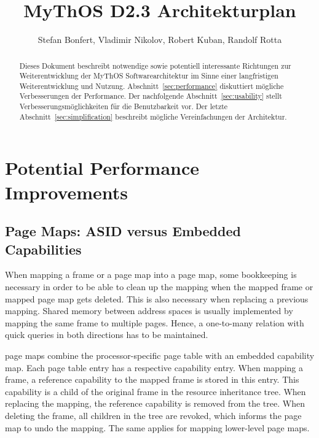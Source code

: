 

\title{MyThOS D2.3 Architekturplan}
\author{Stefan Bonfert, Vladimir Nikolov, Robert Kuban, Randolf Rotta}



\maketitle

\begin{abstract}
  Dieses Dokument beschreibt notwendige sowie potentiell interessante
  Richtungen zur Weiterentwicklung der MyThOS Softwarearchitektur im
  Sinne einer langfristigen Weiterentwicklung und
  Nutzung. Abschnitt~\ref{sec:performance} diskuttiert mögliche
  Verbesserungen der Performance. Der nachfolgende
  Abschnitt~\ref{sec:usability} stellt Verbesserungsmöglichkeiten für
  die Benutzbarkeit vor. Der letzte Abschnitt~\ref{sec:simplification}
  beschreibt mögliche Vereinfachungen der Architektur.
\end{abstract}

\newpage
\tableofcontents

\section{Potential Performance Improvements}
\label{sec:performance}

\subsection{Page Maps: ASID versus Embedded Capabilities}
When mapping a frame or a page map into a page map, some bookkeeping is necessary in order to be able to clean up the mapping when the mapped frame or mapped page map gets deleted. This is also necessary when replacing a previous mapping. Shared memory between address spaces is usually implemented by mapping the same frame to multiple pages. Hence, a one-to-many relation with quick queries in both directions has to be maintained.

\mythos page maps combine the processor-specific page table with an embedded capability map. Each page table entry has a respective capability entry. When mapping a frame, a reference capability to the mapped frame is stored in this entry. This capability is a child of the original frame in the resource inheritance tree. When replacing the mapping, the reference capability is removed from the tree. When deleting the frame, all children in the tree are revoked, which informs the page map to undo the mapping. The same applies for mapping lower-level page maps. 

